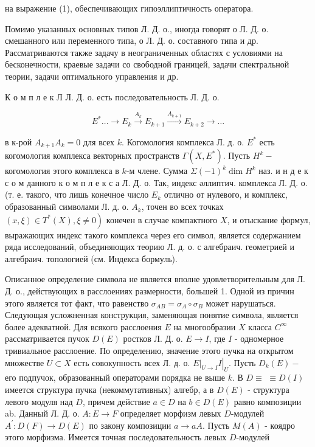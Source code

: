 \documentclass[10pt]{article}
\begin{document}
на выражение (1), обеспечивающих гипоэллиптичность оператора.



Помимо указанных основных типов Л. Д. о., иногда говорят о Л. Д. о. смешанного или переменного типа, о Л. Д. о. составного типа и др. Рассматриваются также задачу в неограниченных областях с условиями на бесконечности, краевые задачи со свободной границей, задачи спектральной теории, задачи оптимального управления и др.



К о м п л е к Л Л. Д. о. есть последовательность Л. Д. о.



\[

E^{*} \ldots \longrightarrow E_{k} \stackrel{A_{k}}{\longrightarrow} E_{k+1} \stackrel{A_{k+1}}{\longrightarrow} E_{k+2} \longrightarrow \ldots

\]



в к-рой $A_{k+1} A_{k}=0$ для всех $k$. Когомология комплекса Л. д. о. $E^{*}$ есть когомология комплекса векторных пространств $\Gamma\left(X, E^{*}\right)$. Пусть $H^{k}-$ когомология этого комплекса в $k$-м члене. Сумма $\Sigma(-1)^{k} \operatorname{dim} H^{k}$ наз. и н д е к с о м данного к о м п л е к с а Л. Д. о. Так, индекс әллиптич. комплекса Л. Д. о. (т. е. такого, что лишь конечное число $E_{k}$ отлично от нулевого, и комплекс, образованный символами Л. д. о. $A_{k}$, точен во всех точках $\left.(x, \xi) \in T^{*}(X), \xi \neq 0\right)$ конечен в случае компактного $X$, и отыскание формул, выражающих индекс такого комплекса через его символ, является содержанием ряда исследований, объединяющих теорию Л. д. о. с алгебраич. геометрией и алгебраич. топологией (см. Индекса бормуль).



Описанное определение символа не является вполне удовлетворительным для Л. Д. о., действующих в расслоениях размерности, большей 1. Одной из причин этого является тот факт, что равенство $\sigma_{A B}=\sigma_{A} \circ \sigma_{B}$ может нарушаться. Следующая усложненная конструкция, заменяющая понятие символа, является более адекватной. Для всякого расслоения $E$ на многообразии $X$ класса $C^{\infty}$ рассматривается пучок $D(E)$ ростков Л. Д. о. $E \rightarrow I$, где $I$ - одномерное тривиальное расслоение. По определению, значение этого пучка на открытом множестве $U \subset X$ есть совокупность всех Л. д. о. $\left.\left.E\right|_{U \rightarrow I} I\right|_{U}$. Пусть $D_{k}(E)-$ его подпучок, образованный операторами порядка не выше $k$. В $D \equiv$ $\equiv D(I)$ имеется структура пучка (некоммутативных) алгебр, а в $D(E)$ - структура левого модуля над $D$, причем действие $a \in D$ на $b \in D(E)$ равно композиции ab. Данный Л. Д. о. $A: E \rightarrow F$ определяет морфизм левых $D$-модулей $A^{\prime}: D(F) \rightarrow D(E)$ по закону композиции $a \rightarrow a A$. Пусть $M(A)$ - коядро этого морфизма. Имеется точная последовательность левых $D$-модулей
\end{document}
